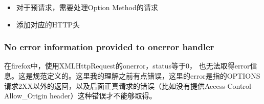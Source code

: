 \begin{itemize}
\item 对于预请求，需要处理Option Method的请求
\item 添加对应的HTTP头
\end{itemize}


\subsubsection{No error information provided to onerror handler}

在firefox中，使用XMLHttpRequest的onerror，status等于0， 也无法取得error信息。这是规范定义的。这里我的理解之前有点错误，这里的error是指的OPTIONS请求2XX以外的返回，以及后面正真请求的错误（比如没有提供Access-Control-Allow_Origin header）这种错误才不能够取得。

